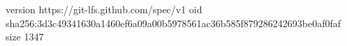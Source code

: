 version https://git-lfs.github.com/spec/v1
oid sha256:3d3c49341630a1460ef6a09a00b5978561ac36b585f879286242693be0af0faf
size 1347
